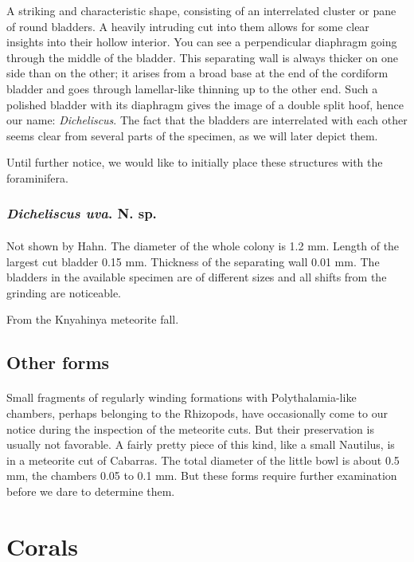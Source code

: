 \documentclass[a4paper, 12pt, oneside]{article}
\begin{document}
A striking and characteristic shape, consisting of an interrelated cluster or pane of round bladders. A heavily intruding cut into them allows for some clear insights into their hollow interior. You can see a perpendicular diaphragm going through the middle of the bladder. This separating wall is always thicker on one side than on the other; it arises from a broad base at the end of the cordiform bladder and goes through lamellar-like thinning up to the other end. Such a polished bladder with its diaphragm gives the image of a double split hoof, hence our name: \emph{Dicheliscus}. The fact that the bladders are interrelated with each other seems clear from several parts of the specimen, as we will later depict them.

Until further notice, we would like to initially place these structures with the foraminifera.
\subsubsection{\emph{Dicheliscus uva}. N. sp.}
\paragraph{}
Not shown by Hahn. The diameter of the whole colony is 1.2 mm. Length of the largest cut bladder 0.15 mm. Thickness of the separating wall 0.01 mm. The bladders in the available specimen are of different sizes and all shifts from the grinding are noticeable.

From the Knyahinya meteorite fall.
\subsection{Other forms}
\paragraph{}
Small fragments of regularly winding formations with Polythalamia-like chambers, perhaps belonging to the Rhizopods, have occasionally come to our notice during the inspection of the meteorite cuts. But their preservation is usually not favorable. A fairly pretty piece of this kind, like a small Nautilus, is in a meteorite cut of Cabarras. The total diameter of the little bowl is about 0.5 mm, the chambers 0.05 to 0.1 mm. But these forms require further examination before we dare to determine them.
\clearpage
\section{Corals}
\end{document}
